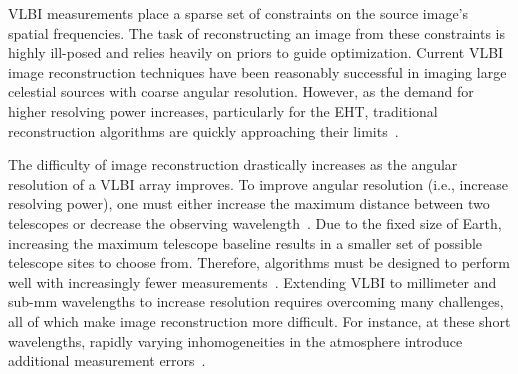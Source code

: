 VLBI measurements place a sparse set of constraints on the source image's spatial frequencies. 
The task of reconstructing an image from these constraints is highly ill-posed and relies heavily on priors to guide optimization. 
Current VLBI image reconstruction techniques have been reasonably successful in imaging large celestial sources with coarse angular resolution. 
However, as the demand for higher resolving power increases, particularly for the EHT, traditional reconstruction algorithms are quickly approaching their limits~\cite{rusenimaging, taylor1999synthesis}. 


The difficulty of image reconstruction drastically increases as the angular resolution of a VLBI array improves. 
To improve angular resolution (i.e., increase resolving power), one must either increase the maximum distance between two telescopes or decrease the observing wavelength~\cite{thompson2008interferometry}. 
Due to the fixed size of Earth, increasing the maximum telescope baseline results in a smaller set of possible telescope sites to choose from.
Therefore, algorithms must be designed to perform well with increasingly fewer measurements~\cite{rusenimaging}.
Extending VLBI to millimeter and sub-mm wavelengths to increase resolution requires overcoming many challenges, all of which make image reconstruction more difficult.
For instance, at these short wavelengths, 
rapidly varying inhomogeneities in the atmosphere introduce additional measurement errors~\cite{monnier2013radio, taylor1999synthesis}.


